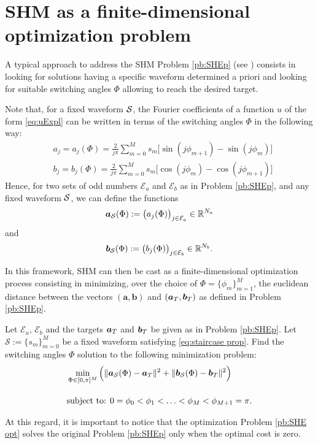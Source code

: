 \documentclass[twocolumn]{autart}    %
\begin{document}
\section{SHM as a finite-dimensional optimization problem}\label{sec:SHE_finite-dim_pbm}

A typical approach to address the SHM Problem \ref{pb:SHEp} (see \cite{Yang2015,Konstantinou2010,Sun1996}) consists in looking for solutions having a specific waveform determined a priori and looking for suitable switching angles $\Phi$ allowing to reach the desired target. 

Note that, for a fixed waveform $\mathcal{S}$, the Fourier coefficients of a function $u$ of the form \eqref{eq:uExpl} can be written in terms of the switching angles $\Phi$ in the following way:
\begin{align*}
	& a_j = a_j(\Phi) =  \frac{2}{j\pi} \sum_{m=0}^{M} s_m \Big[\sin(j\phi_{m+1}) -\sin(j\phi_{m})\Big]
	\\[5pt]
	& b_j = b_j(\Phi) = \frac{2}{j\pi} \sum_{m=0}^{M} s_m \Big[\cos(j\phi_{m}) -\cos(j\phi_{m+1})\Big]
\end{align*}
Hence, for two sets of odd numbers $\mathcal{E}_a$ and $\mathcal{E}_b$ as in Problem \ref{pb:SHEp}, and any fixed waveform $\mathcal{S}$, we can define the functions
\begin{align*}
	\bm{a}_{\mathcal{S}} (\Phi) := \big(a_j (\Phi)\big)_{j\in \mathcal{E}_a} \in \mathbb{R}^{N_a}
\end{align*}
and
\begin{align*}
	\bm{b}_{\mathcal{S}} (\Phi) := \big(b_j (\Phi)\big)_{j\in \mathcal{E}_b} \in \mathbb{R}^{N_b}.
\end{align*}

In this framework, SHM can then be cast as a finite-dimensional optimization process consisting in minimizing, over the choice of $\Phi = \{\phi_m\}_{m=1}^{M}$, the euclidean distance between the vectors $(\bm{a}, \bm{b})$ and $(\bm{a}_T,\bm{b}_T)$ as defined in Problem \ref{pb:SHEp}.

\bigskip

\begin{problem}\label{pb:SHE opt}
Let $\mathcal{E}_a$, $\mathcal{E}_b$ and the targets $\bm{a}_T$ and $\bm{b}_T$ be given as in Problem \ref{pb:SHEp}.  Let $\mathcal S := \{ s_m\}_{m=0}^M$ be a fixed waveform satisfying \eqref{eq:staircase prop}.  Find the switching angles $\Phi$ solution to the following minimization problem:
\begin{align}
	&\min_{\Phi \in [0,\pi]^{M}} \Big( \|\bm{a}_{\mathcal{S}} (\Phi) - \bm{a}_T\|^2 + \| \bm{b}_{\mathcal{S}} (\Phi) - \bm{b}_T\|^2\Big)\notag 
	\\[10pt]
	&\mbox{subject to: } 0 = \phi_0 <\phi_1 < \ldots < \phi_{M} < \phi_{M+1} = \pi. \notag 
\end{align}
\end{problem}
\JOStart
At this regard, it is important to notice that the optimization Problem \ref{pb:SHE opt} solves the original Problem \ref{pb:SHEp} only when the optimal cost is zero. 
\end{document}
